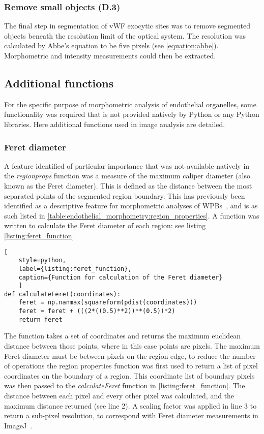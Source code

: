 \subsubsection{Remove small objects (D.3)}
The final step in segmentation of vWF exocytic sites was to remove segmented objects beneath the resolution limit of the optical system. The resolution was calculated by Abbe's equation to be five pixels (see \autoref{equation:abbe}). Morphometric and intensity measurements could then be extracted.

\subsection{Additional functions}
\label{endothelial_morphometry:image_processing:additiona_functions}
For the specific purpose of morphometric analysis of endothelial organelles, some functionality was required that is not provided natively by Python or any Python libraries. Here additional functions used in image analysis are detailed.

\subsubsection{Feret diameter}
A feature identified of particular importance that was not available natively in the \emph{regionprops} function was a measure of the maximum caliper diameter (also known as the Feret diameter). This is defined as the distance between the most separated points of the segmented region boundary. This has previously been identified as a descriptive feature for morphometric analyses of WPBs~\cite{Ferraro2014}, and is as such listed in \autoref{table:endothelial_morphometry:region_properties}. A function was written to calculate the Feret diameter of each region: see listing \autoref{listing:feret_function}.

\begin{lstlisting}[
	style=python,
	label={listing:feret_function},
	caption={Function for calculation of the Feret diameter}
	]
def calculateFeret(coordinates):
    feret = np.nanmax(squareform(pdist(coordinates)))
    feret = feret + (((2*((0.5)**2))**(0.5))*2)
    return feret
\end{lstlisting}

The function takes a set of coordinates and returns the maximum euclidean distance between those points, where in this case points are pixels. The maximum Feret diameter must be between pixels on the region edge, to reduce the number of operations the region properties function was first used to return a list of pixel coordinates on the boundary of a region. This coordinate list of boundary pixels was then passed to the \emph{calculateFeret} function in \autoref{listing:feret_function}. The distance between each pixel and every other pixel was calculated, and the maximum distance returned (see line 2). A scaling factor was applied in line 3 to return a sub-pixel resolution, to correspond with Feret diameter measurements in ImageJ~\cite{ImageJ2003}.


